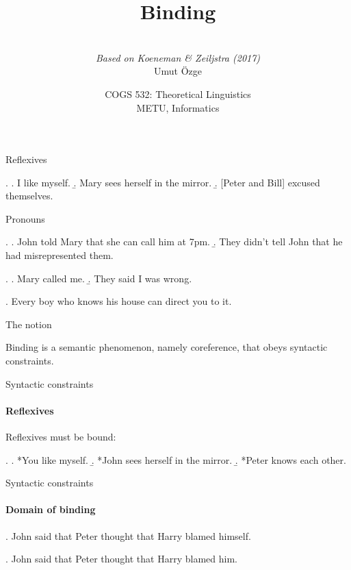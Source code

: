 \documentclass[ignorenonframetext,10pt,aspectratio=169]{beamer}
\title{Binding}
\author{\  \\  {\it Based on Koeneman \& Zeiljstra (2017)} \\ \vspace{20pt} Umut \"Ozge\\  }
\date{COGS 532: Theoretical Linguistics\\ METU, Informatics}
\begin{document}
\begin{frame}\frametitle{}
\thispagestyle{empty}
\maketitle
\end{frame}


\begin{frame}[t,plain]{Reflexives}


\ex. 
		\a. I like myself.
		\b. Mary sees herself in the mirror.
		\b. [Peter and Bill] excused themselves. 





\end{frame}

\begin{frame}[t,plain]{Pronouns}

\ex.
		\a. John told Mary that she can call him at 7pm.
		\b. They didn't tell John that he had misrepresented them.

\ex.
		\a. Mary called me. 
		\b. They said I was wrong.

\ex. Every boy who knows his house can direct you to it.

\end{frame}

\begin{frame}[t,plain]{The notion}

		\vspace{40pt}

		Binding is a semantic phenomenon, namely \alert{coreference}, that obeys syntactic constraints.
	
\end{frame}

\begin{frame}[t,plain]{Syntactic constraints}
		\framesubtitle{Reflexives}

		Reflexives \alert{must} be bound: 

		\ex. \a. *You like myself.
		\b. *John sees herself in the mirror.
		\b. *Peter knows each other.



\end{frame}

\begin{frame}[t,plain]{Syntactic constraints}
		\framesubtitle{Domain of binding}

		\ex.  John said that Peter thought that Harry blamed himself.

		\vspace{40pt}

		\ex.  John said that Peter thought that Harry blamed him.

\end{frame}
\end{document}
